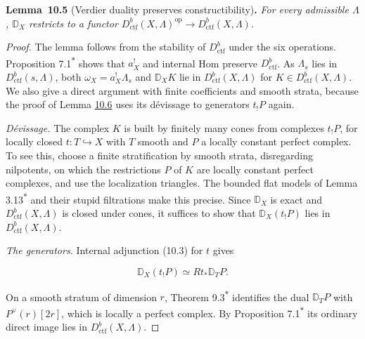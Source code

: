\documentclass[11pt]{article}
\newenvironment{bpstatement}[2]{\par\addvspace{0.6\baselineskip}\noindent\textbf{#1}#2\textbf{.}\enspace\ignorespaces}
  {\par\addvspace{0.4\baselineskip}}
\newenvironment{bpstatementit}[2]{\begin{bpstatement}{#1}{#2}\itshape\ignorespaces}{\end{bpstatement}}
\newcommand{\bpout}[1]{#1\textsuperscript{\hyperlink{bp-outside}{\ensuremath{\ast}}}}
\begin{document}
\label{bp16}%
\begin{bpstatementit}{Lemma~10.5}{ (Verdier duality preserves constructibility)}
For every admissible \(\Lambda\), \(\mathbb D_X\) restricts to a functor \(D^b_{\mathrm{ctf}}(X,\Lambda)^{\mathrm{op}}\to D^b_{\mathrm{ctf}}(X,\Lambda)\).
\end{bpstatementit}

\begin{proof}[{Proof}]\label{bp17}%
The lemma follows from the stability of \(D^b_{\mathrm{ctf}}\) under the six operations. Proposition \bpout{7.1} shows that \(a_X^!\) and internal Hom preserve \(D^b_{\mathrm{ctf}}\). As \(\Lambda_s\) lies in \(D^b_{\mathrm{ctf}}(s,\Lambda)\), both \(\omega_X=a_X^!\Lambda_s\) and \(\mathbb D_XK\) lie in \(D^b_{\mathrm{ctf}}(X,\Lambda)\) for \(K\in D^b_{\mathrm{ctf}}(X,\Lambda)\). We also give a direct argument with finite coefficients and smooth strata, because the proof of Lemma \hyperref[bp19]{10.6} uses its dévissage to generators \(t_!P\) again.

\emph{Dévissage.} The complex \(K\) is built by finitely many cones from complexes \(t_!P\), for locally closed \(t:T\hookrightarrow X\) with \(T\) smooth and \(P\) a locally constant perfect complex. To see this, choose a finite stratification by smooth strata, disregarding nilpotents, on which the restrictions \(P\) of \(K\) are locally constant perfect complexes, and use the localization triangles. The bounded flat models of Lemma \bpout{3.13} and their stupid filtrations make this precise. Since \(\mathbb D_X\) is exact and \(D^b_{\mathrm{ctf}}(X,\Lambda)\) is closed under cones, it suffices to show that \(\mathbb D_X(t_!P)\) lies in \(D^b_{\mathrm{ctf}}(X,\Lambda)\).

\emph{The generators.} Internal adjunction (10.3) for \(t\) gives

\[
\mathbb D_X(t_!P)\simeq Rt_*\mathbb D_TP.
\]

On a smooth stratum of dimension \(r\), Theorem \bpout{9.3} identifies the dual \(\mathbb D_TP\) with \(P^\vee(r)[2r]\), which is locally a perfect complex. By Proposition \bpout{7.1} its ordinary direct image lies in \(D^b_{\mathrm{ctf}}(X,\Lambda)\).
\end{proof}
\end{document}
